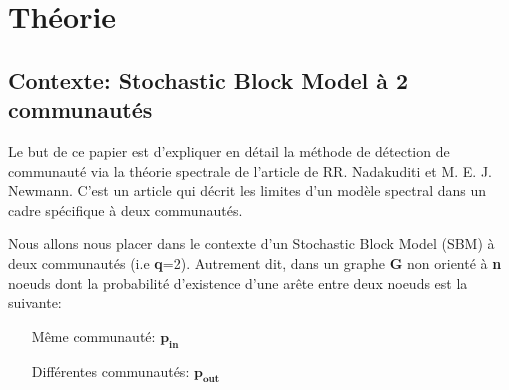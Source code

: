 \section{Théorie}
\subsection{Contexte: Stochastic Block Model à 2 communautés}
Le but de ce papier est d'expliquer en détail la méthode de détection de communauté via la théorie spectrale de l'article de RR. Nadakuditi et M. E. J. Newmann.
C'est un article qui décrit les limites d'un modèle spectral dans un cadre spécifique à deux communautés.

Nous allons nous placer dans le contexte d'un Stochastic Block Model (SBM) à deux communautés (i.e \textbf{q}=2).
Autrement dit, dans un graphe \textbf{G} non orienté à \textbf{n} noeuds dont la probabilité d'existence d'une arête entre deux noeuds est la suivante:
\begin{itemize}\label{rq:probability}
    \item[Même communauté:] $\mathbf{p_{in}}$  
    \item[Différentes communautés:] $\mathbf{p_{out}}$\\
\end{itemize}

